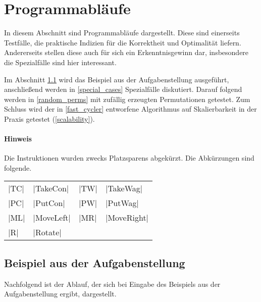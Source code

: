 \clearpage
\section{Programmabläufe}
 In diesem Abschnitt sind Programmabläufe dargestellt. Diese sind einerseits Testfälle, die praktische Indizien für die Korrektheit und Optimalität liefern.
 Andererseits stellen diese auch für sich ein Erkenntnisgewinn dar, insbesondere die Spezialfälle sind hier interessant.

 Im Abschnitt \ref{aufgabenstellung} wird das Beispiel aus der Aufgabenstellung ausgeführt, anschließend werden in \ref{special_cases} Spezialfälle diskutiert.
 Darauf folgend werden in \ref{random_perms} mit zufällig erzeugten Permutationen getestet.
 Zum Schluss wird der in \ref{fast_cycler} entworfene Algorithmus auf Skalierbarkeit in der Praxis getestet (\ref{scalability}).
 
\paragraph{Hinweis} Die Instruktionen wurden zwecks Platzsparens abgekürzt. Die Abkürzungen sind folgende.
 \begin{center}
  \begin{tabular}{llll}
   |TC| & |TakeCon| & |TW| & |TakeWag| \\
   |PC| & |PutCon|  & |PW| & |PutWag|   \\
   |ML| & |MoveLeft|& |MR| & |MoveRight| \\
    |R| & |Rotate|        \\
  \end{tabular}
 \end{center}

\subsection{Beispiel aus der Aufgabenstellung}
\label{aufgabenstellung}
Nachfolgend ist der Ablauf, der sich bei Eingabe des Beispiels aus der Aufgabenstellung ergibt, dargestellt.

